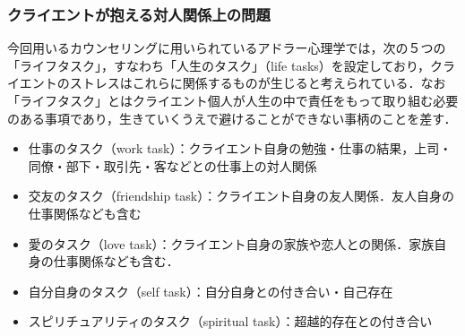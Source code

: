 \documentclass[shuuron]{kuee}
\begin{document}






\subsubsection{クライエントが抱える対人関係上の問題}


今回用いるカウンセリングに用いられているアドラー心理学では，次の５つの「ライフタスク」，すなわち「人生のタスク」（life tasks）を設定しており，クライエントのストレスはこれらに関係するものが生じると考えられている．なお「ライフタスク」とはクライエント個人が人生の中で責任をもって取り組む必要のある事項であり，生きていくうえで避けることができない事柄のことを差す．
\begin{itemize}
  \item 仕事のタスク（work task）：クライエント自身の勉強・仕事の結果，上司・同僚・部下・取引先・客などとの仕事上の対人関係
  \item 交友のタスク（friendship task）：クライエント自身の友人関係．友人自身の仕事関係なども含む
  \item 愛のタスク（love task）：クライエント自身の家族や恋人との関係．家族自身の仕事関係なども含む．
  \item 自分自身のタスク（self task）：自分自身との付き合い・自己存在
  \item スピリチュアリティのタスク（spiritual task）：超越的存在との付き合い\cite{大友秀治2013全人的人間理解を促進するスピリチュアリティ概念に関する一考察}
\end{itemize}
\end{document}
